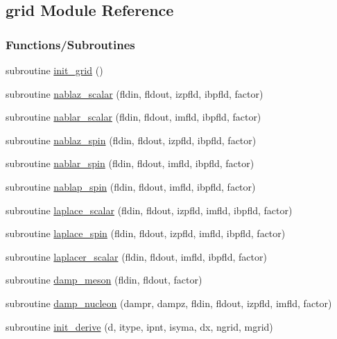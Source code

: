 \hypertarget{namespacegrid}{}\subsection{grid Module Reference}
\label{namespacegrid}
\subsubsection*{Functions/\+Subroutines}
\begin{DoxyCompactItemize}
\item 
subroutine \hyperlink{namespacegrid_a4cb599ddc037e470eb64f386a0971ea5}{init\+\_\+grid} ()
\item 
subroutine \hyperlink{namespacegrid_a0d6ef544d8d744ea1c6b70658774a4b2}{nablaz\+\_\+scalar} (fldin, fldout, izpfld, ibpfld, factor)
\item 
subroutine \hyperlink{namespacegrid_ab8b751012b26ee67998674d81747d532}{nablar\+\_\+scalar} (fldin, fldout, imfld, ibpfld, factor)
\item 
subroutine \hyperlink{namespacegrid_a35f707d0d56204d4f6474c5808a93dbc}{nablaz\+\_\+spin} (fldin, fldout, izpfld, ibpfld, factor)
\item 
subroutine \hyperlink{namespacegrid_ab4994ce54858ab4a5ca1d1f97260ebad}{nablar\+\_\+spin} (fldin, fldout, imfld, ibpfld, factor)
\item 
subroutine \hyperlink{namespacegrid_a7030a73b3eff3d418914c2f94e6f5eca}{nablap\+\_\+spin} (fldin, fldout, imfld, ibpfld, factor)
\item 
subroutine \hyperlink{namespacegrid_a40e9fda41c6370cd95343f7033601e1e}{laplace\+\_\+scalar} (fldin, fldout, izpfld, imfld, ibpfld, factor)
\item 
subroutine \hyperlink{namespacegrid_a807f502b4225a59f7575c250a8ccd032}{laplace\+\_\+spin} (fldin, fldout, izpfld, imfld, ibpfld, factor)
\item 
subroutine \hyperlink{namespacegrid_adb67b33df30984560a4a640e00a40f99}{laplacer\+\_\+scalar} (fldin, fldout, imfld, ibpfld, factor)
\item 
subroutine \hyperlink{namespacegrid_a75afbba2c2a62cbb743d49cc49daa186}{damp\+\_\+meson} (fldin, fldout, factor)
\item 
subroutine \hyperlink{namespacegrid_a07298a336f9ab0a423504ef5826db475}{damp\+\_\+nucleon} (dampr, dampz, fldin, fldout, izpfld, imfld, factor)
\item 
subroutine \hyperlink{namespacegrid_a2e25b0f7ec79d19d9b91b80efd0489da}{init\+\_\+derive} (d, itype, ipnt, isyma, dx, ngrid, mgrid)

\end{DoxyCompactItemize}
